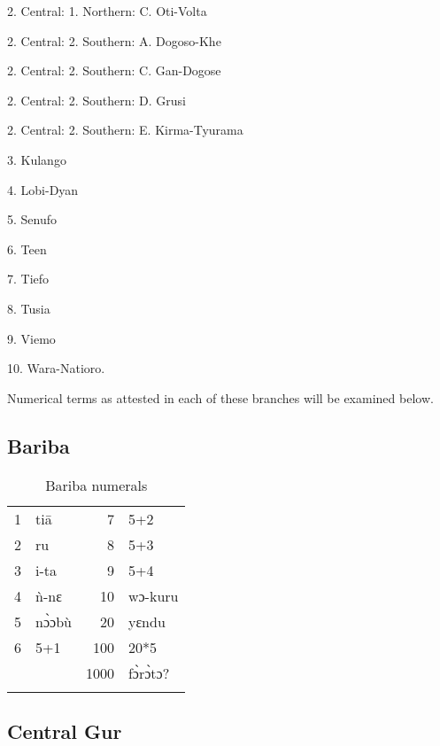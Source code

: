 2. Central: 1. Northern: C. Oti-Volta

2. Central: 2. Southern: A. Dogoso-Khe

2. Central: 2. Southern: C. Gan-Dogose

2. Central: 2. Southern: D. Grusi

2. Central: 2. Southern: E. Kirma-Tyurama

3. Kulango

4. Lobi-Dyan

5. Senufo

6. Teen

7. Tiefo

8. Tusia

9. Viemo

10. Wara-Natioro.

Numerical terms as attested in each of these branches will be examined below.

 
\subsection{Bariba}%
\begin{table}
\caption{\label{tab:3:163}Bariba numerals}


\begin{tabularx}{\textwidth}{lXrX}
\lsptoprule

{1} & ti{\={a}} & {7} & 5+2\\
{2} & ru & {8} & 5+3\\
{3} & i-ta & {9} & 5+4\\
{4} & {\`{n}}-nɛ & {10} & wɔ-kuru\\
{5} & n{\`{ɔ}}ɔb{\`{u}} & {20} & yɛndu\\
{6} & 5+1 & {100} & 20*5\\
&  & {1000} & f{\`{ɔ}}r{\`{ɔ}}tɔ? \\
\lspbottomrule
\end{tabularx}
\end{table}

\clearpage
\subsection{Central Gur}%
